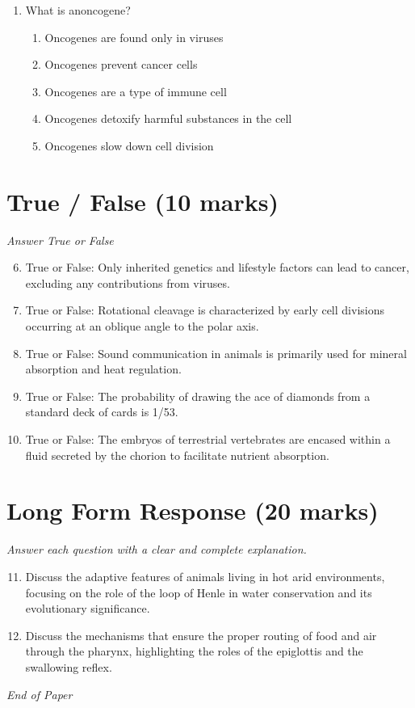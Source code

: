 \documentclass[12pt]{article}
\begin{document}
\begin{enumerate}[label=\arabic*.]
\begin{enumerate}[label=(\alph*)]
    \item parenchyma
    \item phloem
    \item endoderm
    \item pericycle
    \item cortex
\end{enumerate}
\item What is anoncogene?
\begin{enumerate}[label=(\alph*)]
    \item Oncogenes are found only in viruses
    \item Oncogenes prevent cancer cells
    \item Oncogenes are a type of immune cell
    \item Oncogenes detoxify harmful substances in the cell
    \item Oncogenes slow down cell division
\end{enumerate}
\end{enumerate}

\section*{True / False (10 marks)}
\textit{Answer True or False}
\begin{enumerate}[label=\arabic*.]
\setcounter{enumi}{5}
\item True or False: Only inherited genetics and lifestyle factors can lead to cancer, excluding any contributions from viruses.
\item True or False: Rotational cleavage is characterized by early cell divisions occurring at an oblique angle to the polar axis.
\item True or False: Sound communication in animals is primarily used for mineral absorption and heat regulation.
\item True or False: The probability of drawing the ace of diamonds from a standard deck of cards is 1/53.
\item True or False: The embryos of terrestrial vertebrates are encased within a fluid secreted by the chorion to facilitate nutrient absorption.
\end{enumerate}

\section*{Long Form Response (20 marks)}
\textit{Answer each question with a clear and complete explanation.}
\begin{enumerate}[label=\arabic*.]
\setcounter{enumi}{10}
\item Discuss the adaptive features of animals living in hot arid environments, focusing on the role of the loop of Henle in water conservation and its evolutionary significance.
\item Discuss the mechanisms that ensure the proper routing of food and air through the pharynx, highlighting the roles of the epiglottis and the swallowing reflex.
\end{enumerate}

\vfill
\noindent\textit{End of Paper}
\end{document}
